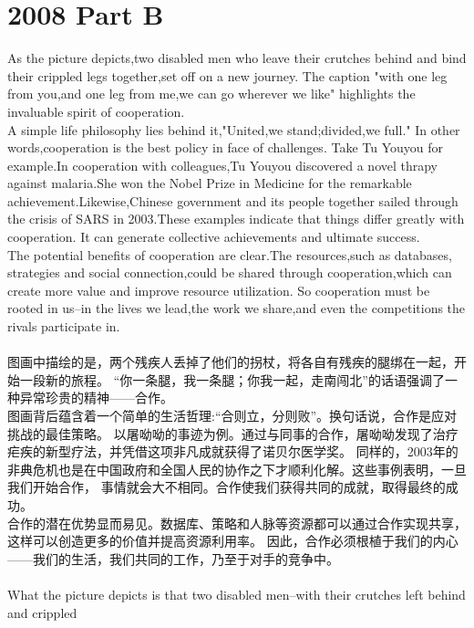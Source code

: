\documentclass[UTF8]{article}
\begin{document}
    \section*{2008 Part B}
    As the picture depicts,two disabled men who leave their crutches
    behind and bind their crippled legs together,set off on a new journey.
    The caption "with one leg from you,and one leg from me,we can go wherever 
    we like" highlights the invaluable spirit of cooperation.\\
    A simple life philosophy lies behind it,"United,we stand;divided,we full."
    In other words,cooperation is the best policy in face of challenges.
    Take Tu Youyou for example.In cooperation with colleagues,Tu Youyou discovered 
    a novel thrapy against malaria.She won the Nobel Prize in Medicine for the remarkable 
    achievement.Likewise,Chinese government and its people together sailed through the 
    crisis of SARS in 2003.These examples indicate that things differ greatly with cooperation.
    It can generate collective achievements and ultimate success.\\
    The potential benefits of cooperation are clear.The resources,such as databases,
    strategies and social connection,could 
    be shared through cooperation,which can create more value and improve resource utilization.
    So cooperation must be rooted in us--in the lives we lead,the work we share,and even the 
    competitions the rivals participate in.\\
    \\
    图画中描绘的是，两个残疾人丢掉了他们的拐杖，将各自有残疾的腿绑在一起，开始一段新的旅程。
    “你一条腿，我一条腿；你我一起，走南闯北”的话语强调了一种异常珍贵的精神——合作。\\
    图画背后蕴含着一个简单的生活哲理:“合则立，分则败”。换句话说，合作是应对挑战的最佳策略。
    以屠呦呦的事迹为例。通过与同事的合作，屠呦呦发现了治疗疟疾的新型疗法，并凭借这项非凡成就获得了诺贝尔医学奖。
    同样的，2003年的非典危机也是在中国政府和全国人民的协作之下才顺利化解。这些事例表明，一旦我们开始合作，
    事情就会大不相同。合作使我们获得共同的成就，取得最终的成功。\\
    合作的潜在优势显而易见。数据库、策略和人脉等资源都可以通过合作实现共享，这样可以创造更多的价值并提高资源利用率。
    因此，合作必须根植于我们的内心——我们的生活，我们共同的工作，乃至于对手的竞争中。
    \\\\
    What the picture depicts is that two disabled men--with their crutches left behind and crippled 
\end{document}
